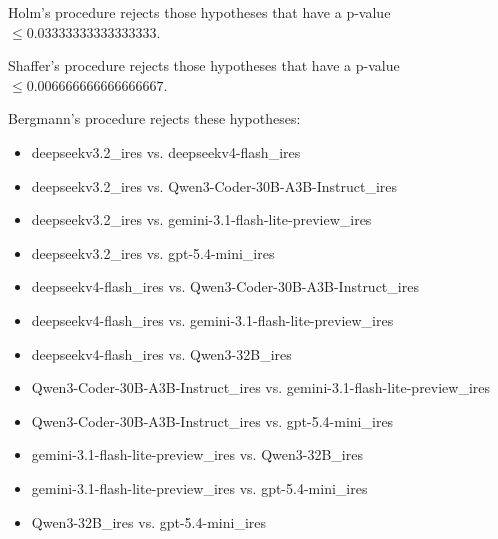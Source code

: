 \documentclass[a4paper,10pt]{article}
\begin{document}
\begin{landscape}
Holm's procedure rejects those hypotheses that have a p-value $\le0.03333333333333333$.


Shaffer's procedure rejects those hypotheses that have a p-value $\le0.006666666666666667$.


Bergmann's procedure rejects these hypotheses:


\begin{itemize}


\item deepseekv3.2_ires vs. deepseekv4-flash_ires
\item deepseekv3.2_ires vs. Qwen3-Coder-30B-A3B-Instruct_ires
\item deepseekv3.2_ires vs. gemini-3.1-flash-lite-preview_ires
\item deepseekv3.2_ires vs. gpt-5.4-mini_ires
\item deepseekv4-flash_ires vs. Qwen3-Coder-30B-A3B-Instruct_ires
\item deepseekv4-flash_ires vs. gemini-3.1-flash-lite-preview_ires
\item deepseekv4-flash_ires vs. Qwen3-32B_ires
\item Qwen3-Coder-30B-A3B-Instruct_ires vs. gemini-3.1-flash-lite-preview_ires
\item Qwen3-Coder-30B-A3B-Instruct_ires vs. gpt-5.4-mini_ires
\item gemini-3.1-flash-lite-preview_ires vs. Qwen3-32B_ires
\item gemini-3.1-flash-lite-preview_ires vs. gpt-5.4-mini_ires
\item Qwen3-32B_ires vs. gpt-5.4-mini_ires
\end{itemize}



\end{landscape}
\end{document}
